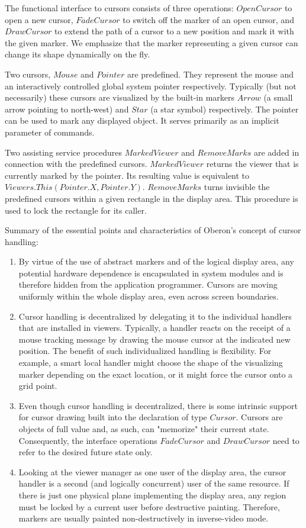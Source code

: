 The functional interface to cursors consists of three operations: $OpenCursor$ to open a new cursor,
$FadeCursor$ to switch off the marker of an open cursor, and $DrawCursor$ to extend the path of a
cursor to a new position and mark it with the given marker. We emphasize that the marker
representing a given cursor can change its shape dynamically on the fly.

Two cursors, $Mouse$ and $Pointer$ are predefined. They represent the mouse and an interactively
controlled global system pointer respectively. Typically (but not necessarily) these cursors are
visualized by the built-in markers $Arrow$ (a small arrow pointing to north-west) and $Star$ (a star
symbol) respectively. The pointer can be used to mark any displayed object. It serves primarily as
an implicit parameter of commands.

Two assisting service procedures $MarkedViewer$ and $RemoveMarks$ are added in connection with
the predefined cursors. $MarkedViewer$ returns the viewer that is currently marked by the pointer.
Its resulting value is equivalent to $Viewers.This(Pointer.X, Pointer.Y)$. $RemoveMarks$ turns
invisible the predefined cursors within a given rectangle in the display area. This procedure is
used to lock the rectangle for its caller.

Summary of the essential points and characteristics of Oberon's concept of cursor handling:
\begin{enumerate}
	\item By virtue of the use of abstract markers and of the logical display area, any potential hardware
dependence is encapsulated in system modules and is therefore hidden from the application
programmer. Cursors are moving uniformly within the whole display area, even across screen
boundaries.

	\item Cursor handling is decentralized by delegating it to the individual handlers that are installed in
viewers. Typically, a handler reacts on the receipt of a mouse tracking message by drawing the
mouse cursor at the indicated new position. The benefit of such individualized handling is
flexibility. For example, a smart local handler might choose the shape of the visualizing marker
depending on the exact location, or it might force the cursor onto a grid point.
	\item Even though cursor handling is decentralized, there is some intrinsic support for cursor
drawing built into the declaration of type $Cursor$. Cursors are objects of full value and, as such,
can "memorize" their current state. Consequently, the interface operations $FadeCursor$ and $DrawCursor$ need to refer to the desired future state only.
	\item Looking at the viewer manager as one user of the display area, the cursor handler is a second
(and logically concurrent) user of the same resource. If there is just one physical plane
implementing the display area, any region must be locked by a current user before destructive
painting. Therefore, markers are usually painted non-destructively in inverse-video mode.
\end{enumerate}

